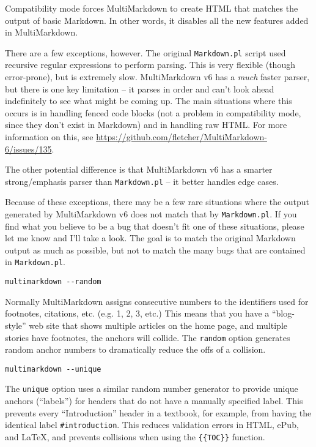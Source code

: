 Compatibility mode forces MultiMarkdown to create HTML that matches the output of basic Markdown. In other words, it disables all the new features added in MultiMarkdown.

There are a few exceptions, however. The original \texttt{Markdown.pl} script used recursive regular expressions to perform parsing. This is very flexible (though error-prone), but is extremely slow. MultiMarkdown v6 has a \emph{much} faster parser, but there is one key limitation -- it parses in order and can't look ahead indefinitely to see what might be coming up. The main situations where this occurs is in handling fenced code blocks (not a problem in compatibility mode, since they don't exist in Markdown) and in handling raw HTML. For more information on this, see \href{https://github.com/fletcher/MultiMarkdown-6/issues/135}{https:\slash{}\slash{}github.com\slash{}fletcher\slash{}MultiMarkdown-6\slash{}issues\slash{}135}.

The other potential difference is that MultiMarkdown v6 has a smarter strong\slash{}emphasis parser than \texttt{Markdown.pl} -- it better handles edge cases.

Because of these exceptions, there may be a few rare situations where the output generated by MultiMarkdown v6 does not match that by \texttt{Markdown.pl}. If you find what you believe to be a bug that doesn't fit one of these situations, please let me know and I'll take a look. The goal is to match the original Markdown output as much as possible, but not to match the many bugs that are contained in \texttt{Markdown.pl}.

\begin{verbatim}
multimarkdown --random
\end{verbatim}

Normally MultiMarkdown assigns consecutive numbers to the identifiers used for footnotes, citations, etc. (e.g. 1, 2, 3, etc.) This means that you have a ``blog-style'' web site that shows multiple articles on the home page, and multiple stories have footnotes, the anchors will collide. The \texttt{random} option generates random anchor numbers to dramatically reduce the offs of a collision.

\begin{verbatim}
multimarkdown --unique
\end{verbatim}

The \texttt{unique} option uses a similar random number generator to provide unique anchors (``labels'') for headers that do not have a manually specified label. This prevents every ``Introduction'' header in a textbook, for example, from having the identical label \texttt{\#introduction}. This reduces validation errors in HTML, ePub, and LaTeX, and prevents collisions when using the \texttt{\{\{TOC\}\}} function.


